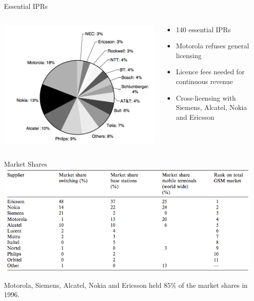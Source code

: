 \begin{frame}{Essential IPRs}
  \begin{columns}
      \begin{column}{0.55\textwidth}
          \includegraphics[width=\textwidth]{pictures/iprs}
      \end{column}
      \hfill
    
      \begin{column}{0.45\textwidth}
          \begin{itemize}
              \item 140 essential IPRs
              \item Motorola refuses general licensing
              \item Licence fees needed for continuous revenue
              \item Cross-licensing with Siemens, Alcatel, Nokia and Ericsson
          \end{itemize}
      \end{column}
      \end{columns}
\end{frame}

\begin{frame}{Market Shares}
  \includegraphics[width=\textwidth]{pictures/2gmarketshares}
  
  Motorola, Siemens, Alcatel, Nokia and Ericsson held $85\%$ of the market shares in 1996.
\end{frame}


